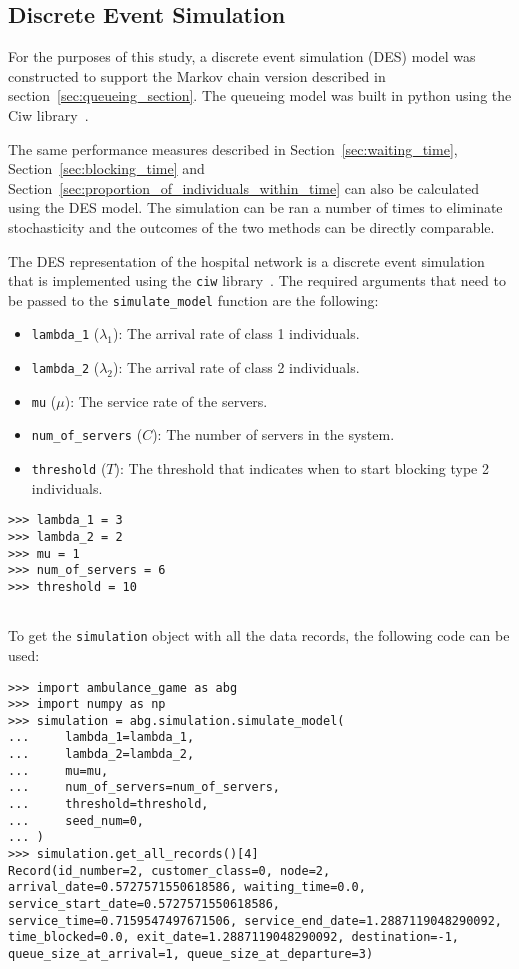\subsection{Discrete Event Simulation}

For the purposes of this study, a discrete event simulation (DES) model was
constructed to support the Markov chain version described in
section~\ref{sec:queueing_section}.
The queueing model was built in python using the Ciw
library~\cite{ciwpython}.

The same performance measures described in Section~\ref{sec:waiting_time},
Section~\ref{sec:blocking_time} and
Section~\ref{sec:proportion_of_individuals_within_time} can also be
calculated using the DES model.
The simulation can be ran a number of times to eliminate stochasticity and the
outcomes of the two methods can be directly comparable.

The DES representation of the hospital network is a discrete event simulation
that is implemented using the \texttt{ciw} library~\cite{ciwpython}.
The required arguments that need to be passed to the
\texttt{simulate\_model} function are the following:

\begin{itemize}
    \item \texttt{lambda\_1} (\(\lambda_1\)): The arrival rate of class 1
    individuals.
    \item \texttt{lambda\_2} (\(\lambda_2\)): The arrival rate of class 2
    individuals.
    \item \texttt{mu} (\(\mu\)): The service rate of the servers.
    \item \texttt{num\_of\_servers} (\(C\)): The number of servers in the
    system.
    \item \texttt{threshold} (\(T\)): The threshold that indicates when to start
    blocking type 2 individuals.
\end{itemize}

\begin{lstlisting}[style=pystyle]
>>> lambda_1 = 3
>>> lambda_2 = 2
>>> mu = 1
>>> num_of_servers = 6
>>> threshold = 10
    
\end{lstlisting}

To get the \texttt{simulation} object with all the data records, the following
code can be used:

\begin{lstlisting}[style=pystyle]
>>> import ambulance_game as abg
>>> import numpy as np
>>> simulation = abg.simulation.simulate_model(
...     lambda_1=lambda_1,
...     lambda_2=lambda_2,
...     mu=mu,
...     num_of_servers=num_of_servers,
...     threshold=threshold,
...     seed_num=0,
... )
>>> simulation.get_all_records()[4]
Record(id_number=2, customer_class=0, node=2, arrival_date=0.5727571550618586, waiting_time=0.0, service_start_date=0.5727571550618586, service_time=0.7159547497671506, service_end_date=1.2887119048290092, time_blocked=0.0, exit_date=1.2887119048290092, destination=-1, queue_size_at_arrival=1, queue_size_at_departure=3)

\end{lstlisting}

